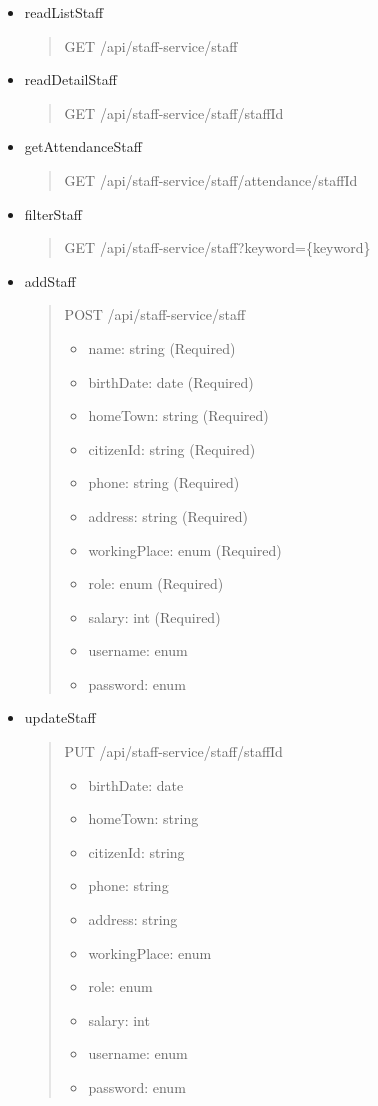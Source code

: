 \begin{itemize}
	\item readListStaff
	\begin{quote}
		GET /api/staff-service/staff
	\end{quote}

	\item readDetailStaff
	\begin{quote}
		GET /api/staff-service/staff/{staffId}
	\end{quote}

	\item getAttendanceStaff
	\begin{quote}
		GET /api/staff-service/staff/attendance/{staffId}
	\end{quote}

	\item filterStaff
	\begin{quote}
		GET /api/staff-service/staff?keyword=\{keyword\}
	\end{quote}

	\item addStaff
	\begin{quote}
		POST /api/staff-service/staff
		\begin{itemize}
			\item name: string (Required)
			\item birthDate: date (Required)
			\item homeTown: string (Required)
			\item citizenId: string (Required)
			\item phone: string (Required)
			\item address: string (Required)
			\item workingPlace: enum (Required)
			\item role: enum (Required)
			\item salary: int (Required)
			\item username: enum
			\item password: enum
		\end{itemize}
	\end{quote}

	\item updateStaff
	\begin{quote}
		PUT /api/staff-service/staff/{staffId}
		\begin{itemize}
			\item birthDate: date
			\item homeTown: string
			\item citizenId: string
			\item phone: string
			\item address: string
			\item workingPlace: enum
			\item role: enum
			\item salary: int
			\item username: enum
			\item password: enum
		\end{itemize}
	\end{quote}


\end{itemize}
